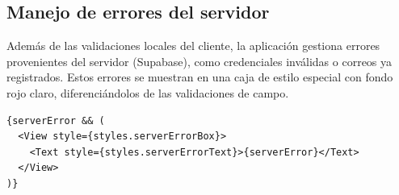 \subsection{Manejo de errores del servidor}

Adem\'as de las validaciones locales del cliente, la aplicaci\'on gestiona
errores provenientes del servidor (Supabase), como credenciales inv\'alidas o
correos ya registrados. Estos errores se muestran en una caja de estilo
especial con fondo rojo claro, diferenci\'andolos de las validaciones de campo.

\begin{lstlisting}
{serverError && (
  <View style={styles.serverErrorBox}>
    <Text style={styles.serverErrorText}>{serverError}</Text>
  </View>
)}
\end{lstlisting}
